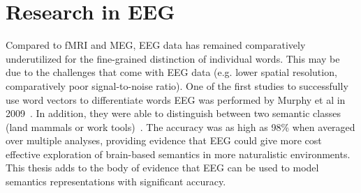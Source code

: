 \section{Research in EEG}

Compared to fMRI and MEG, EEG data has remained comparatively underutilized for 
the fine-grained distinction of individual words. This may be due to the 
challenges that come with EEG data (e.g. lower spatial resolution, 
comparatively poor signal-to-noise ratio).  One of the first studies to 
successfully use word vectors to differentiate words EEG was performed by 
Murphy et al in 2009~\cite{Murphy2009}. In addition, they were able to 
distinguish between two semantic classes (land mammals or work 
tools)~\cite{Murphy2009,Murphy2011}. The accuracy was as high as 98\% when 
averaged over multiple analyses, providing evidence that EEG could give more 
cost effective exploration of brain-based semantics in more naturalistic 
environments. This thesis adds to the body of evidence that EEG can be used to 
model semantics representations with significant accuracy.
